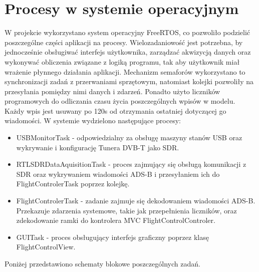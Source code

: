 \documentclass[eng,printmode]{mgr}
\begin{document}
\section{Procesy w systemie operacyjnym}
W projekcie wykorzystano system operacyjny FreeRTOS, co pozwoliło podzielić poszczególne części aplikacji na procesy. Wielozadaniowość jest potrzebna, by jednocześnie obsługiwać interfejs użytkownika, zarządzać akwizycją danych oraz wykonywać obliczenia związane z logiką programu, tak aby użytkownik miał wrażenie płynnego działania aplikacji. Mechanizm semaforów wykorzystano to synchronizacji zadań z przerwaniami sprzętowym, natomiast kolejki pozwoliły na przesyłania pomiędzy nimi danych i zdarzeń. Ponadto użyto liczników programowych do odliczania czasu życia poszczególnych wpisów w modelu. Każdy wpis jest usuwany po 120s od otrzymania ostatniej dotyczącej go wiadomości.
\newpage
\noindent
W systemie wydzielono następujące procesy:
\begin{itemize}
\item USBMonitorTask - odpowiedzialny za obsługę maszyny stanów USB oraz wykrywanie i konfigurację Tunera DVB-T jako SDR. 
  
\item RTLSDRDataAquisitionTask - proces zajmujący się obsługą komunikacji z SDR oraz wykrywaniem wiadomości ADS-B i przesyłaniem ich do FlightControlerTask poprzez kolejkę.
    
\item FlightControlerTask - zadanie zajmuje się dekodowaniem wiadomości ADS-B. Przekazuje zdarzenia systemowe, takie jak przepełnienia liczników, oraz zdekodowanie ramki do kontrolera MVC FlightControlControler.

\item GUITask - proces obsługujący interfejs graficzny poprzez klasę FlightControlView.
\end{itemize}
\noindent
Poniżej przedstawiono schematy blokowe poszczególnych zadań.
\end{document}
